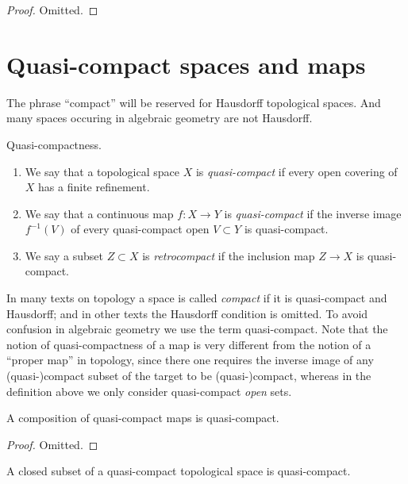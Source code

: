 \begin{proof}
Omitted.
\end{proof}







\section{Quasi-compact spaces and maps}
\label{section-quasi-compact}

\noindent
The phrase ``compact'' will be reserved
for Hausdorff topological spaces. And many spaces occuring
in algebraic geometry are not Hausdorff.

\begin{definition}
\label{definition-quasi-compact}
Quasi-compactness.
\begin{enumerate}
\item We say that a topological space $X$ is {\it quasi-compact}
if every open covering of $X$ has a finite refinement.
\item We say that a continuous map $f : X \to Y$ is {\it quasi-compact}
if the inverse image $f^{-1}(V)$ of every quasi-compact open $V \subset Y$
is quasi-compact.
\item We say a subset $Z \subset X$ is {\it retrocompact}
if the inclusion map $Z \to X$ is quasi-compact.
\end{enumerate}
\end{definition}

\noindent
In many texts on topology a space is called {\it compact} if it
is quasi-compact and Hausdorff; and in other texts the Hausdorff
condition is omitted. To avoid confusion in algebraic geometry
we use the term quasi-compact. Note that the notion of quasi-compactness
of a map is very different from the notion of a ``proper map''
in topology, since there one requires the inverse image of any
(quasi-)compact subset of the target to be (quasi-)compact,
whereas in the definition above we only consider quasi-compact
{\it open} sets.

\begin{lemma}
\label{lemma-composition-quasi-compact}
A composition of quasi-compact maps is quasi-compact.
\end{lemma}

\begin{proof}
Omitted.
\end{proof}

\begin{lemma}
\label{lemma-closed-in-quasi-compact}
A closed subset of a quasi-compact topological space
is quasi-compact.
\end{lemma}

